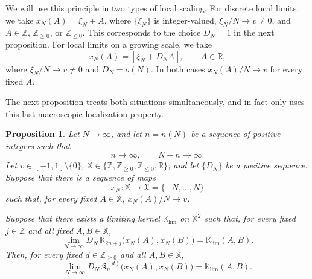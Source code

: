 \documentclass[reqno,11pt]{amsart}
\newcommand{\ZZ}{\mathbb{Z}}
\newcommand{\RR}{\mathbb{R}}
\theoremstyle{plain}
\newtheorem{prop}[thm]{Proposition}
\theoremstyle{definition}
\numberwithin{equation}{section}
\begin{document}
We will use this principle in two types of local scaling. For discrete local limits, we take $x_N(A)=\xi_N+A$, where
$\{\xi_N\}$ is integer-valued, $\xi_N/N\to v\neq0$, and
$A\in\ZZ$, $\ZZ_{\geq0}$, or $\ZZ_{\leq0}$. This corresponds to the choice $D_N=1$ in the next proposition. For local limits on a growing scale, we take
\[
x_N(A)=\left\lfloor \xi_N+D_NA\right\rfloor,
\qquad A\in\RR,
\]
where $\xi_N/N\to v\neq0$ and $D_N=o(N)$.
In both cases $x_N(A)/N\to v$ for every fixed $A$.

The next proposition treats both situations simultaneously, and in fact only uses this last macroscopic localization property.

\begin{prop}\label{As_prop_neq0}
Let $N\to\infty$, and let $n=n(N)$ be a sequence of positive
integers such that
\[
n\longrightarrow\infty,
\qquad
N-n\longrightarrow\infty.
\]
Let $v\in[-1,1]\setminus\{0\}$, $\mathbb X\in
\{\ZZ,\ZZ_{\geq0},\ZZ_{\leq0},\RR\}$, and let $\{D_N\}$ be a positive sequence. Suppose that there is a sequence of maps
\[
x_N:\mathbb X\longrightarrow\mathfrak X=\{-N,\ldots,N\}
\]
such that, for every fixed $A\in\mathbb X$, 
${x_N(A)}/{N}\longrightarrow v$.

Suppose that there exists a limiting kernel $\mathbb K_{\lim}$ on $\mathbb X^2$ such that, for every fixed $j\in\ZZ$ and all fixed $A,B\in\mathbb X$,
\[
\lim_{N\to\infty}
D_N\,
\mathbb K_{2n+j}
\bigl(x_N(A),x_N(B)\bigr)
=
\mathbb K_{\lim}(A,B).
\]
Then, for every fixed $d\in\ZZ_{\geq0}$ and all
$A,B\in\mathbb X$,
\[
\lim_{N\to\infty}
D_N\,
\mathfrak K_n^{(d)}
\bigl(x_N(A),x_N(B)\bigr)
=
\mathbb K_{\lim}(A,B).
\]
\end{prop}
\end{document}
